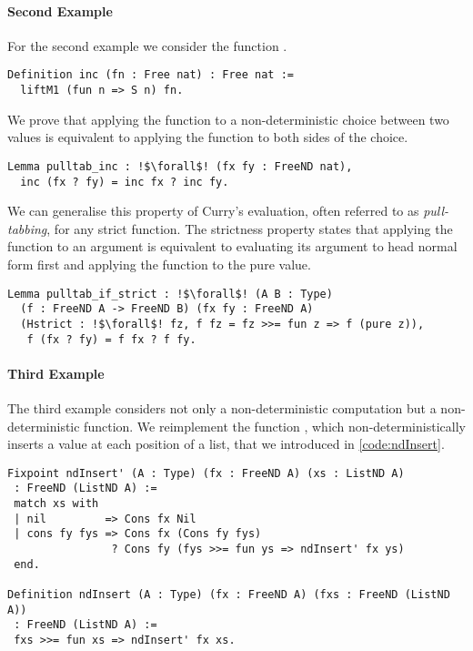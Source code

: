 \paragraph{Second Example}
For the second example we consider the function .

\begin{verbatim}
Definition inc (fn : Free nat) : Free nat :=
  liftM1 (fun n => S n) fn.
\end{verbatim}

We prove that applying the function  to a non\--deterministic choice between two values is equivalent to applying the function to both sides of the choice.

\begin{verbatim}
Lemma pulltab_inc : !$\forall$! (fx fy : FreeND nat),
  inc (fx ? fy) = inc fx ? inc fy.
\end{verbatim}

We can generalise this property of Curry's evaluation, often referred to as \emph{pull\--tabbing}, for any strict function.
The strictness property states that applying the function to an argument is equivalent to evaluating its argument to head normal form first and applying the function to the pure value.

\begin{verbatim}
Lemma pulltab_if_strict : !$\forall$! (A B : Type)
  (f : FreeND A -> FreeND B) (fx fy : FreeND A)
  (Hstrict : !$\forall$! fz, f fz = fz >>= fun z => f (pure z)),
   f (fx ? fy) = f fx ? f fy.
\end{verbatim}

\paragraph{Third Example}
The third example considers not only a non\--deterministic computation but a non\--deterministic function.
We reimplement the function , which non\--deterministically inserts a value at each position of a list, that we introduced in \autoref{code:ndInsert}.

\begin{verbatim}
Fixpoint ndInsert' (A : Type) (fx : FreeND A) (xs : ListND A)
 : FreeND (ListND A) :=
 match xs with
 | nil         => Cons fx Nil
 | cons fy fys => Cons fx (Cons fy fys)
                ? Cons fy (fys >>= fun ys => ndInsert' fx ys)
 end.

Definition ndInsert (A : Type) (fx : FreeND A) (fxs : FreeND (ListND A))
 : FreeND (ListND A) :=
 fxs >>= fun xs => ndInsert' fx xs.
\end{verbatim}

